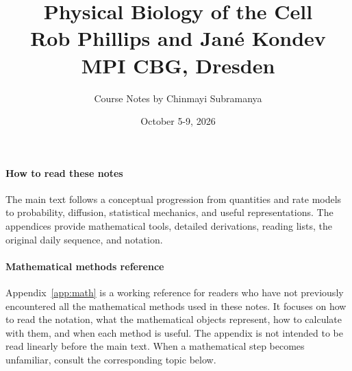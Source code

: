 \documentclass[11pt]{article}
\title{\huge{Physical Biology of the Cell} \\ \medskip 
\Large{Rob Phillips and Jan\'{e} Kondev} \\ \medskip
\large{MPI CBG, Dresden}
}
\date{October 5-9, 2026}
\author{Course Notes by Chinmayi Subramanya}
\newcommand{\conceptualedition}{Conceptually organized edition}
\begin{document}
\maketitle
\paragraph*{How to read these notes}
The main text follows a conceptual progression from quantities and rate models to probability, diffusion, statistical mechanics, and useful representations.
The appendices provide mathematical tools, detailed derivations, reading lists, the original daily sequence, and notation.

\paragraph*{Mathematical methods reference}
Appendix~\ref{app:math} is a working reference for readers who have not previously encountered all the mathematical methods used in these notes.
It focuses on how to read the notation, what the mathematical objects represent, how to calculate with them, and when each method is useful.
The appendix is not intended to be read linearly before the main text.
When a mathematical step becomes unfamiliar, consult the corresponding topic below.
\end{document}
